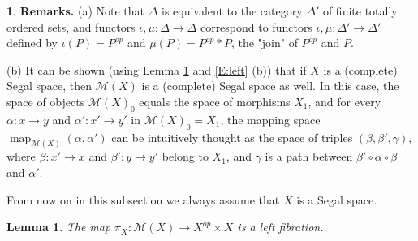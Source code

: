 \documentclass[12pt]{amsart}
\theoremstyle{plain}
\newtheorem{Lem}[Thm]{Lemma}
\theoremstyle{definition}
\newtheorem{Emp}[Thm]{}
\numberwithin{equation}{section}
\newcommand{\cal}[1]{\mathcal{#1}}
\newcommand{\C}[1]{\cal#1}
\newcommand{\gm}{\gamma}
\newcommand{\Dt}{\Delta}
\newcommand{\al}{\alpha}
\newcommand{\rl}[1]{Lemma \ref{L:#1}}
\newcommand{\re}[1]{\ref{E:#1}}
\newcommand{\map}{\operatorname{map}}
\begin{document}
\begin{Emp}
{\bf Remarks.} (a) Note that $\Dt$ is equivalent to the category
$\Dt'$ of finite totally ordered sets, and functors
$\iota,\mu:\Dt\to\Dt$ correspond to functors
$\iota,\mu:\Dt'\to\Dt'$ defined by $\iota(P)=P^{op}$ and
$\mu(P)=P^{op}*P$, the "join" of $P^{op}$ and $P$.

(b) It can be shown (using \rl{morp} and \re{left} (b)) that if $X$ is a 
(complete) Segal space, then $\C{M}(X)$ is a (complete) Segal space as well.
In this case, the space of objects $\C{M}(X)_0$ equals the space of morphisms $X_1$, 
and for every  $\al:x\to y$ and $\al':x'\to y'$ in $\C{M}(X)_0=X_1$, the mapping space
$\map_{\C{M}(X)}(\al,\al')$ can be intuitively thought as the space of triples $(\beta,\beta',\gm)$, 
where $\beta:x'\to x$ and $\beta':y\to y'$ belong to $X_1$, and $\gm$ is a path between 
$\beta'\circ\al\circ\beta$ and $\al'$. 
\end{Emp}

From now on in this subsection we always assume that $X$ is a
Segal space.

\begin{Lem} \label{L:morp}
The map $\pi_X:\C{M}(X)\to X^{op}\times X$ is a left fibration.
\end{Lem}
\end{document}
